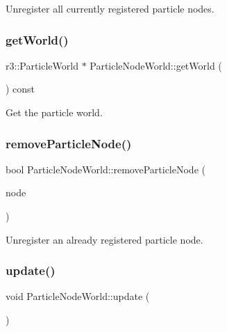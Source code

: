 Unregister all currently registered particle nodes. 

\mbox{\label{class_particle_node_world_a116327867d29eedea0781ea604b499ee}} 
\subsubsection{\texorpdfstring{get\+World()}{getWorld()}}
{\footnotesize\ttfamily r3\+::\+Particle\+World $\ast$ Particle\+Node\+World\+::get\+World (\begin{DoxyParamCaption}{ }\end{DoxyParamCaption}) const}



Get the particle world. 

\mbox{\label{class_particle_node_world_ae63b0fc7c346b724ae73a050c181d16c}} 
\subsubsection{\texorpdfstring{remove\+Particle\+Node()}{removeParticleNode()}}
{\footnotesize\ttfamily bool Particle\+Node\+World\+::remove\+Particle\+Node (\begin{DoxyParamCaption}\item[{\mbox{\hyperlink{class_particle_node}{Particle\+Node}} $\ast$}]{node }\end{DoxyParamCaption})}



Unregister an already registered particle node. 

\mbox{\label{class_particle_node_world_ad4ec6dd216a026ea9199a3c4b18e380b}} 
\subsubsection{\texorpdfstring{update()}{update()}}
{\footnotesize\ttfamily void Particle\+Node\+World\+::update (\begin{DoxyParamCaption}{ }\end{DoxyParamCaption})}



